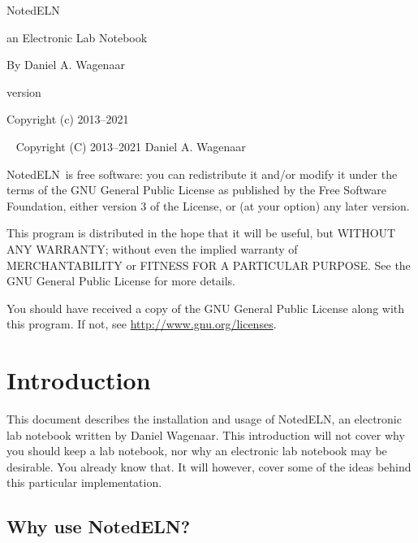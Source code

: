 \documentclass[11pt]{report}
\newcommand{\NotedELN}{NotedELN} %
\begin{document}
\begin{titlepage}
\begin{centering}
  {\Huge \NotedELN}
  \vskip30pt

  {\Large an Electronic Lab Notebook}
  \vskip60pt


  {\large By Daniel A. Wagenaar}
  \vfill

{\large version {}}
\vskip10pt


  {Copyright (c) 2013--2021}

\end{centering}
\end{titlepage}
~
\vfill
\noindent Copyright (C) 2013--2021 Daniel A. Wagenaar\medskip

\NotedELN\ is free software: you can redistribute it and/or modify
it under the terms of the GNU General Public License as published by
the Free Software Foundation, either version 3 of the License, or
(at your option) any later version.

This program is distributed in the hope that it will be useful,
but WITHOUT ANY WARRANTY; without even the implied warranty of
MERCHANTABILITY or FITNESS FOR A PARTICULAR PURPOSE.  See the
GNU General Public License for more details.

You should have received a copy of the GNU General Public License
along with this program.  If not, see \url{http://www.gnu.org/licenses}.

\tableofcontents
\clearpage
{}

\chapter{Introduction}

This document describes the installation and usage of \NotedELN, an
electronic lab notebook written by Daniel Wagenaar.  This introduction
will not cover why you should keep a lab notebook, nor why an
electronic lab notebook may be desirable. You already know that.  It
will however, cover some of the ideas behind this particular
implementation.

\section{Why use \NotedELN?}
\end{document}
